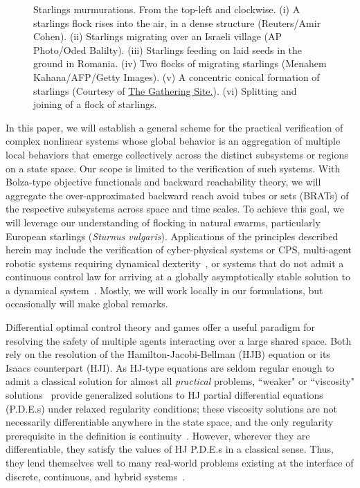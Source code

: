 \begin{figure}[tb!]
\begin{tabular}{ccc}
	\end{tabular}
	\caption{Starlings murmurations. From the top-left and clockwise. (i) A starlings flock rises into the air, in a dense structure (Reuters/Amir Cohen).  (ii) Starlings migrating over an Israeli village (AP Photo/Oded Balilty). (iii) Starlings feeding on laid seeds  in the ground in Romania. (iv) Two flocks of migrating starlings (Menahem Kahana/AFP/Getty Images). (v) A concentric conical formation of starlings (Courtesy of \href{http://www.thegatheringsite.net/qcgems/2014/1/24/murmuration}{The Gathering Site.}). (vi)  Splitting and joining of a flock of starlings.} 
	\label{fig:murmurations}
\end{figure}

In this paper, we will establish a general scheme 
for the practical verification of complex nonlinear systems whose global behavior is an aggregation of multiple local behaviors that emerge collectively across the distinct subsystems or regions on a state space. Our scope is limited to the verification of such systems. With Bolza-type objective functionals and backward reachability theory, we will aggregate the over-approximated  backward reach avoid tubes or sets (BRATs) of the respective subsystems across space and time scales.  To achieve this goal, we will leverage our understanding of flocking in natural swarms, particularly European starlings (\textit{Sturnus vulgaris}). Applications of the principles described herein may include the verification of cyber-physical systems or CPS, multi-agent robotic systems requiring dynamical dexterity~\cite{SeqCompKoditschek}, or  systems that do not admit a continuous control law for arriving at a globally asymptotically stable solution to a dynamical system~\cite{Brockett83}.  Mostly, we will work locally in our formulations, but occasionally will make global remarks. 

Differential optimal control theory and games offer a useful paradigm for resolving the safety of multiple agents interacting over a large shared space. Both rely on the resolution of the Hamilton-Jacobi-Bellman (HJB) equation or its Isaacs counterpart (HJI).  As HJ-type equations are seldom regular enough to admit a classical solution for almost all \textit{practical} problems, ``weaker" or ``viscosity" solutions~\cite{Lions1982, Evans1984, Crandall1984} provide generalized  solutions to HJ partial differential equations (P.D.E.s) under relaxed regularity conditions; these viscosity solutions are not necessarily differentiable anywhere in the state space, and the only regularity prerequisite in the definition is continuity~\cite{Crandall1983viscosity}. However, wherever they are differentiable, they satisfy the  values of HJ P.D.E.s in a classical sense. Thus, they lend themselves well to many real-world problems existing at the interface of discrete, continuous, and hybrid systems~\cite{LygerosReachability,  Mitchell2020, Souganidis, Mitchell2005}.

